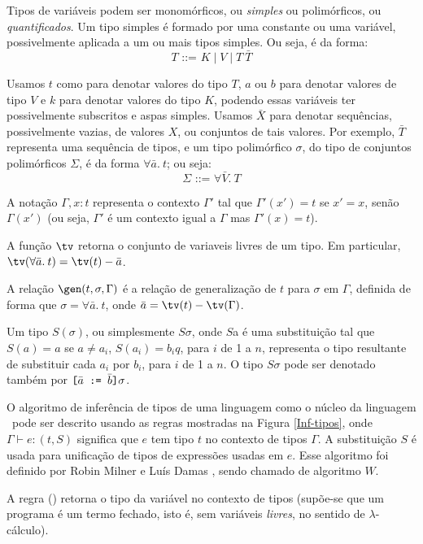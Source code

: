 Tipos de variáveis podem ser monomórficos, ou {\em simples\/} ou
polimórficos, ou {\em quantificados\/}. Um tipo simples é formado por
uma constante ou uma variável, possivelmente aplicada a um ou mais
tipos simples. Ou seja, é da forma:
\[ T \texttt{ ::= } K \mid V \mid T\: \bar{T} \]

Usamos $t$ como para denotar valores do tipo $T$, $a$ ou $b$ para
denotar valores de tipo $V$ e $k$ para denotar valores do tipo $K$,
podendo essas variáveis ter possivelmente subscritos e aspas
simples. Usamos $\bar{X}$ para denotar sequências, possivelmente
vazias, de valores $X$, ou conjuntos de tais valores. Por exemplo,
$\bar{T}$ representa uma sequência de tipos, e um tipo polimórfico
$\sigma$, do tipo de conjuntos polimórficos $\Sigma$, é da forma
$\forall \bar{a}.\:t$; ou seja:
\[ \Sigma \texttt{ ::= } \forall \bar{V}.\: T \]

A notação $\Gamma, x:t$ representa o contexto $\Gamma'$ tal que
$\Gamma'(x') = t$ se $x'=x$, senão $\Gamma(x')$ (ou seja, $\Gamma'$ é
um contexto igual a $\Gamma$ mas $\Gamma'(x) = t$).

A função $\tv$ retorna o conjunto de variaveis livres de um tipo. Em
particular, $\tv(\forall\bar{a}.\:t) = \tv(t) - \bar{a}$.

A relação $\gen(t,\sigma,\Gamma)$ é a relação de generalização de $t$
para $\sigma$ em $\Gamma$, definida de forma que $\sigma =
\forall\bar{a}.\:t$, onde $\bar{a} = \tv(t) - \tv(\Gamma)$.

Um tipo $S(\sigma)$, ou simplesmente $S\sigma$, onde $S$a é uma
substituição tal que $S(a) = a$ se $a \not= a_i$, $S(a_i) = b_iq$,
para $i$ de 1 a $n$, representa o tipo resultante de substituir cada
$a_i$ por $b_i$, para $i$ de 1 a $n$. O tipo $S\sigma$ pode ser
denotado também por
 $\texttt{\symbol{91}}\bar{a}\texttt{ := }\bar{b}\texttt{\symbol{93}}\sigma$.

O algoritmo de inferência de tipos de uma linguagem como o núcleo da
linguagem \ML\ pode ser descrito usando as regras mostradas na Figura
\ref{Inf-tipos}, onde $\Gamma \vdash e: (t,S)$ significa que $e$ tem
tipo $t$ no contexto de tipos $\Gamma$. A substituição $S$ é usada
para unificação de tipos de expressões usadas em $e$. Esse algoritmo
foi definido por Robin Milner e Luís Damas \cite{DamasMilner82}, sendo
chamado de algoritmo $W$.

A regra (\VAR) retorna o tipo da variável no contexto de tipos
(supõe-se que um programa é um termo fechado, isto é, sem variáveis
{\em livres\/}, no sentido de $\lambda$-cálculo).

